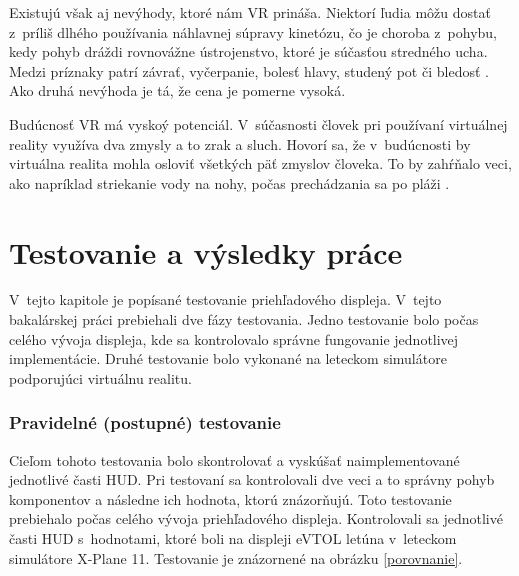 Existujú však aj nevýhody, ktoré nám VR prináša. Niektorí ľudia môžu dostať z~príliš dlhého používania náhlavnej súpravy kinetózu, čo je choroba z~pohybu, kedy pohyb dráždi rovnovážne ústrojenstvo, ktoré je súčasťou stredného ucha. Medzi príznaky patrí závrať, vyčerpanie, bolesť hlavy, studený pot či bledosť \cite{Kinetoza}. Ako druhá nevýhoda je tá, že cena je pomerne vysoká.

Budúcnosť VR má vyskoý potenciál. V~súčasnosti človek pri používaní virtuálnej reality využíva dva zmysly a to zrak a sluch. Hovorí sa, že v~budúcnosti by virtuálna realita mohla osloviť všetkých päť zmyslov človeka. To by zahŕňalo veci, ako napríklad striekanie vody na nohy, počas prechádzania sa po pláži \cite{HTCVive}.

\chapter{Testovanie a výsledky práce}
V~tejto kapitole je popísané testovanie priehľadového displeja. V~tejto bakalárskej práci prebiehali dve fázy testovania. Jedno testovanie bolo počas celého vývoja displeja, kde sa kontrolovalo správne fungovanie jednotlivej implementácie. Druhé testovanie bolo vykonané na leteckom simulátore podporujúci virtuálnu realitu. 

\subsection{Pravidelné (postupné) testovanie}
Cieľom tohoto testovania bolo skontrolovať a vyskúšať naimplementované jednotlivé časti HUD. Pri testovaní sa kontrolovali dve veci a to správny pohyb komponentov a následne ich hodnota, ktorú znázorňujú. Toto testovanie prebiehalo počas celého vývoja priehľadového displeja. Kontrolovali sa jednotlivé časti HUD s~hodnotami, ktoré boli na displeji eVTOL letúna v~leteckom simulátore X-Plane 11. Testovanie je znázornené na obrázku \ref{porovnanie}.

